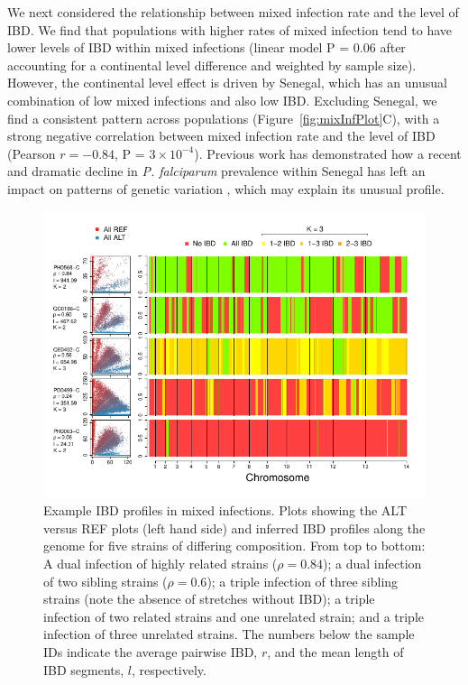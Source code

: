 \documentclass[9pt,lineno]{elife}
\begin{document}
We next considered the relationship between mixed infection rate and the level of IBD.  We find that populations with higher rates of mixed infection tend to have lower levels of IBD within mixed infections (linear model P = 0.06 after accounting for a continental level difference and weighted by sample size).  However, the continental level effect is driven by Senegal, which has an unusual combination of low mixed infections and also low IBD.  Excluding Senegal, we find a consistent pattern across populations (Figure~\ref{fig:mixInfPlot}C), with a strong negative correlation between mixed infection rate and the level of IBD (Pearson $r = -0.84$, P = $3\times10^{-4}$).  Previous work has demonstrated how a recent and dramatic decline in \emph{P. falciparum} prevalence within Senegal has left an impact on patterns of genetic variation \citep{Daniels2015}, which may explain its unusual profile.

\begin{figure}[ht]
  \begin{center}
  \includegraphics[width=.9\textwidth]{Fig5.pdf}
    \caption{Example IBD profiles in mixed infections. Plots showing the ALT versus REF plots (left hand side) and inferred IBD profiles along the genome for five strains of differing composition.  From top to bottom: A dual infection of highly related strains ($\rho = 0.84$); a dual infection of two sibling strains ($\rho = 0.6$); a triple infection of three sibling strains (note the absence of stretches without IBD); a triple infection of two related strains and one unrelated strain; and a triple infection of three unrelated strains.  The numbers below the sample IDs indicate the average pairwise IBD, $r$, and the mean length of IBD segments, $l$, respectively.}\label{fig:strainIBD}
    \end{center}
\end{figure}
\end{document}
